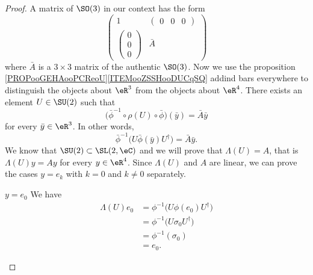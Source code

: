 \begin{proof}
    A matrix of \( \SO(3)\) in our context has the form
    \begin{equation}
        \begin{pmatrix}
            1    &   \begin{pmatrix} 
                0    &   0    &   0    
            \end{pmatrix}\\ 
            \begin{pmatrix}
                0    \\ 
                0    \\ 
                0    
            \end{pmatrix}&   \bar A    
        \end{pmatrix}
    \end{equation}
    where \( \bar A\) is a \( 3\times 3\) matrix of the authentic \( \SO(3)\). Now we use the proposition \ref{PROPooGEHAooPCReoU}\ref{ITEMooZSSHooDUCqSQ} addind bars everywhere to distinguish the objects about \( \eR^3\) from the objects about \( \eR^4\). There exists an element \( U\in \SU(2)\) such that
    \begin{equation}
        \big( \bar\phi^{-1}\circ\rho(U)\circ\bar \phi \big)(\bar y)=\bar A\bar y
    \end{equation}
    for every \( \bar y\in \eR^3\). In other words, 
    \begin{equation}
        \bar\phi^{-1}\big( U\bar\phi(\bar y)U^{\dag} \big)=\bar A\bar y.
    \end{equation}
    We know that \( \SU(2)\subset \SL(2,\eC)\) and we will prove that \( \Lambda(U)=A\), that is \( \Lambda(U)y=Ay\) for every \( y\in \eR^4\). Since \( \Lambda(U)\) and \( A\) are linear, we can prove the cases \( y=e_k\) with \( k=0\) and \( k\neq 0\) separately.
    \begin{subproof}
        \item[$ y=e_0$]
            We have
            \begin{subequations}
                \begin{align}
                    \Lambda(U)e_0&=\phi^{-1}\big( U\phi(e_0) U^{\dag}\big)\\
                    &=\phi^{-1}\big( U\sigma_0U^{\dag} \big)\\
                    &=\phi^{-1}(\sigma_0)\\
                    &=e_0.
                \end{align}
            \end{subequations}

\end{subproof}
\end{proof}
